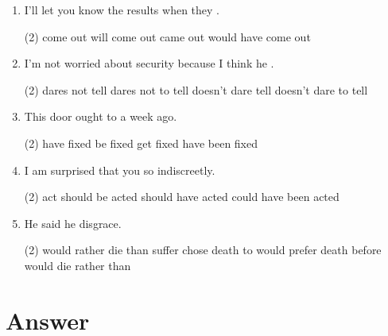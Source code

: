 \begin{enumerate}
\item I'll let you know the results when they \ttu.
  \begin{tasks}(2)
    \task come out
    \task will come out
    \task came out
    \task would have come out
  \end{tasks}

\item I'm not worried about security because I think he \ttu.
  \begin{tasks}(2)
    \task dares not tell
    \task dares not to tell
    \task doesn't dare tell
    \task doesn't dare to tell
  \end{tasks}

\item This door ought to \ttu a week ago.
  \begin{tasks}(2)
    \task have fixed
    \task be fixed
    \task get fixed
    \task have been fixed
  \end{tasks}

\item I am surprised that you \ttu so indiscreetly.
  \begin{tasks}(2)
    \task act
    \task should be acted
    \task should have acted
    \task could have been acted
  \end{tasks}

\item He said he \ttu disgrace.
  \begin{tasks}(2)
    \task would rather die than suffer
    \task chose death to
    \task would prefer death before
    \task would die rather than
  \end{tasks}

\end{enumerate}

\section{Answer}

